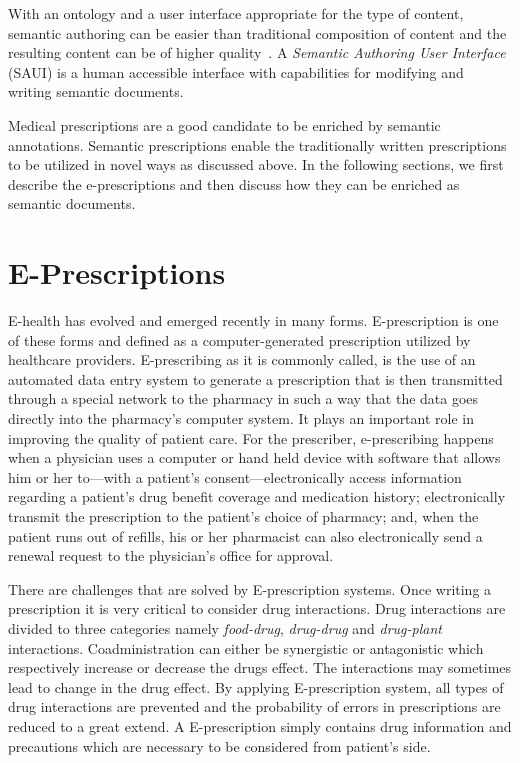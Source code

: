 \documentclass[10pt, conference, compsocconf]{IEEEtran}
\begin{document}
With an ontology and a user interface appropriate for the type of content, semantic authoring can be easier than traditional composition of content and the resulting content can be of higher quality~\cite{hasida2007}. 
A \emph{Semantic Authoring User Interface} (SAUI) is a human accessible interface with capabilities for modifying and writing semantic documents.

Medical prescriptions are a good candidate to be enriched by semantic annotations.
Semantic prescriptions enable the traditionally written prescriptions to be utilized in novel ways as discussed above.
In the following sections, we first describe the e-prescriptions and then discuss how they can be enriched as semantic documents.

\section{E-Prescriptions}
\label{epresc}
E-health has evolved and emerged recently in many forms.
E-prescription is one of these forms and defined as a computer-generated prescription utilized by healthcare providers.
E-prescribing as it is commonly called, is the use of an automated data entry system to generate a prescription that is then transmitted through a special network to the pharmacy in such a way that the data goes directly into the pharmacy’s computer system.
It plays an important role in improving the quality of patient care.
For the prescriber, e-prescribing happens when a physician uses a computer or hand held device with software that allows him or her to—with a patient’s consent—electronically access information regarding a patient’s drug benefit coverage and medication history; electronically transmit the prescription to the patient’s choice of pharmacy; and, when the patient runs out of refills, his or her pharmacist can also electronically send a renewal request to the physician’s office for approval.

There are challenges that are solved by E-prescription systems.
Once writing a prescription it is very critical to consider drug interactions.
Drug interactions are divided to three categories namely \emph{food-drug}, \emph{drug-drug} and \emph{drug-plant} interactions.
Coadministration can either be synergistic or antagonistic which respectively increase or decrease the drugs effect.
The interactions may sometimes lead to change in the drug effect.
By applying E-prescription system, all types of drug interactions are prevented and the probability of errors in prescriptions are reduced to a great extend.
A E-prescription simply contains drug information and precautions which are necessary to be considered from patient's side.
\end{document}
